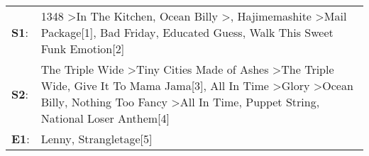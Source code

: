 \begin{supertabular}{p{0.03\textwidth}p{0.92\textwidth}}
 \textbf{S1}:  &                                                                                                                                          1348\textsuperscript{} \textgreater \enspace In The Kitchen\textsuperscript{}, \enspace Ocean Billy\textsuperscript{} \textgreater {}\textsuperscript{}, \enspace Hajimemashite\textsuperscript{} \textgreater \enspace Mail Package[1]\textsuperscript{}, \enspace Bad Friday\textsuperscript{}, \enspace Educated Guess\textsuperscript{}, \enspace Walk This Sweet Funk Emotion[2]\textsuperscript{}  \enspace  \\
 \textbf{S2}:  &  The Triple Wide\textsuperscript{} \textgreater \enspace Tiny Cities Made of Ashes\textsuperscript{} \textgreater \enspace The Triple Wide\textsuperscript{}, \enspace Give It To Mama Jama[3]\textsuperscript{}, \enspace All In Time\textsuperscript{} \textgreater \enspace Glory\textsuperscript{} \textgreater \enspace Ocean Billy\textsuperscript{}, \enspace Nothing Too Fancy\textsuperscript{} \textgreater \enspace All In Time\textsuperscript{}, \enspace Puppet String\textsuperscript{}, \enspace National Loser Anthem[4]\textsuperscript{}  \enspace  \\
 \textbf{E1}:  &                                                                                                                                                                                                                                                                                                                                                                                                                                                                                         Lenny\textsuperscript{}, \enspace Strangletage[5]\textsuperscript{}  \enspace  \\
\end{supertabular}
